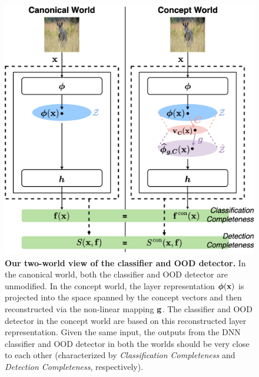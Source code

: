 \begin{figure}[ht]
\centering
\includegraphics[scale=0.17]{figures/completeness_3.png} 
\caption{
\textbf{Our two-world view of the classifier and OOD detector.} In the canonical world, both the classifier and OOD detector are unmodified. In the concept world, the layer representation $\bm{\phi}(\mathbf{x})$ is projected into the space spanned by the concept vectors and then reconstructed via the non-linear mapping $\mathbf{g}$. The classifier and OOD detector in the concept world are based on this reconstructed layer representation. Given the same input, the outputs from the DNN classifier and OOD detector in both the worlds should be very close to each other (characterized by \textit{Classification Completeness} and \textit{Detection Completeness}, respectively).
}
\label{fig:detection-completeness}
\vspace{-0.19in}
\end{figure}
%
\iffalse

